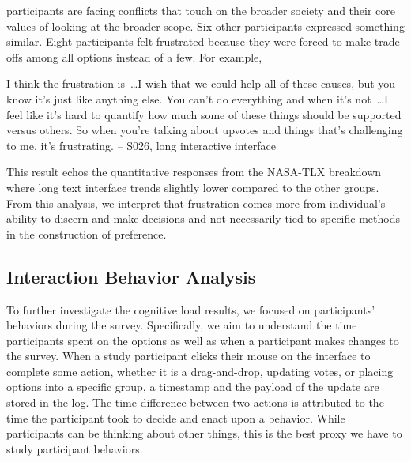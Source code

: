 participants are facing conflicts that touch on the broader society and their core values of looking at the broader scope. Six other participants expressed something similar. Eight participants felt frustrated because they were forced to make trade-offs among all options instead of a few. For example, 
\begin{displayquote}
I think the frustration is~\ldots I wish that we could help all of these causes, but you know it's just like anything else. You can't do everything and when it's not~\ldots  I feel like it's hard to quantify how much some of these things should be supported versus others. So when you're talking about upvotes and things that's challenging to me, it's frustrating.
\noindent \hfill -- S026, long interactive interface
\end{displayquote}
This result echos the quantitative responses from the NASA-TLX breakdown where long text interface trends slightly lower compared to the other groups. From this analysis, we interpret that frustration comes more from individual's ability to discern and make decisions and not necessarily tied to specific methods in the construction of preference.



\subsection{Interaction Behavior Analysis}
To further investigate the cognitive load results, we focused on participants' behaviors during the survey. Specifically, we aim to understand the time participants spent on the options as well as when a participant makes changes to the survey. When a study participant clicks their mouse on the interface to complete some action, whether it is a drag-and-drop, updating votes, or placing options into a specific group, a timestamp and the payload of the update are stored in the log. The time difference between two actions is attributed to the time the participant took to decide and enact upon a behavior. While participants can be thinking about other things, this is the best proxy we have to study participant behaviors.

